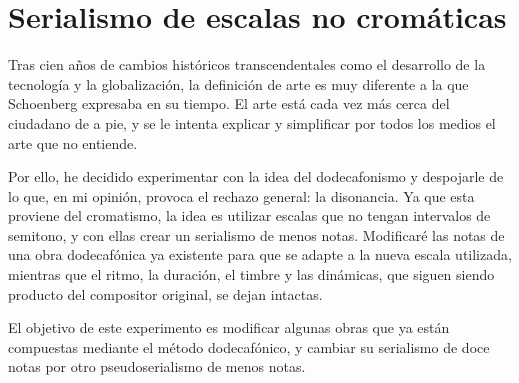 	\section{Serialismo de escalas no cromáticas}
	Tras cien años de cambios históricos transcendentales como el desarrollo de la tecnología y la globalización, la definición de arte es muy diferente a la que Schoenberg expresaba en su tiempo. El arte está cada vez más cerca del ciudadano de a pie, y se le intenta explicar y simplificar por todos los medios el arte que no entiende.
	
	Por ello, he decidido experimentar con la idea del dodecafonismo y despojarle de lo que, en mi opinión, provoca el rechazo general: la disonancia. Ya que esta proviene del cromatismo, la idea es utilizar escalas que no tengan intervalos de semitono, y con ellas crear un serialismo de menos notas. Modificaré las notas de una obra dodecafónica ya existente para que se adapte a la nueva escala utilizada, mientras que el ritmo, la duración, el timbre y las dinámicas, que siguen siendo producto del compositor original, se dejan intactas.
	
	El objetivo de este experimento es modificar algunas obras que ya están compuestas mediante el método dodecafónico, y cambiar su serialismo de doce notas por otro pseudoserialismo de menos notas. 